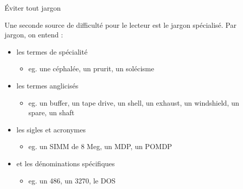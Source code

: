 \documentclass[french]{beamer}
\begin{document}
\begin{frame}{Éviter tout jargon}

Une seconde source de difficulté pour le lecteur est le jargon spécialisé. Par jargon, on entend :
\begin{itemize}
	\item les termes de spécialité
	\begin{itemize}
		\item eg. une céphalée, un prurit, un solécisme
	\end{itemize}
	
	\item les termes anglicisés 
	\begin{itemize}
		\item eg. un buffer, un tape drive, un shell, un exhaust, un windshield, un spare, un shaft
	\end{itemize}
	\item les sigles et acronymes
	\begin{itemize}
		\item eg. un SIMM de 8 Meg, un MDP, un POMDP
	\end{itemize}
	\item et les dénominations spécifiques
	\begin{itemize}
		\item eg. un 486, un 3270, le DOS
	\end{itemize}
\end{itemize}
\end{frame}
\end{document}
